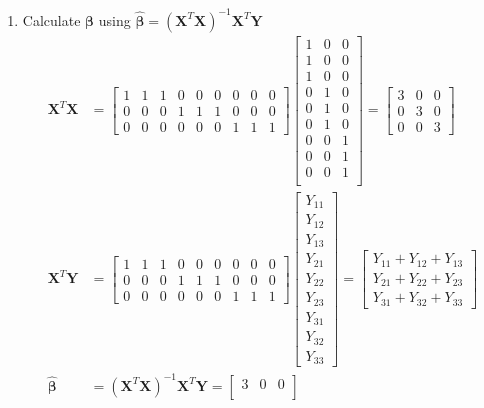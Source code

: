 \documentclass{article}
\begin{document}
\begin{enumerate}[leftmargin = 0 em, label = \arabic*., font = \bfseries]
\begin{enumerate}
		\item 
		Calculate $\bm \beta$ using $\hat{\bm \beta} = (\bm X^T \bm X)^{-1}\bm X^{T}\bm Y$
		\begin{align*}
		\bm X^T \bm X &= \begin{bmatrix}
			1&1&1&0&0&0&0&0&0\\
			0&0&0&1&1&1&0&0&0\\
			0&0&0&0&0&0&1&1&1
		\end{bmatrix} 
		\begin{bmatrix}
			1&0&0\\
			1&0&0\\
			1&0&0\\
			0&1&0\\
			0&1&0\\
			0&1&0\\
			0&0&1\\
			0&0&1\\
			0&0&1\\
		\end{bmatrix}
		= \begin{bmatrix}
			3&0&0\\
			0&3&0\\
			0&0&3
		\end{bmatrix}
		\\
		\bm X^T \bm Y & = \begin{bmatrix}
			1&1&1&0&0&0&0&0&0\\
			0&0&0&1&1&1&0&0&0\\
			0&0&0&0&0&0&1&1&1
		\end{bmatrix}
		\begin{bmatrix}
			Y_{11}\\
			Y_{12}\\
			Y_{13}\\
			Y_{21}\\
			Y_{22}\\
			Y_{23}\\
			Y_{31}\\
			Y_{32}\\
			Y_{33}
		\end{bmatrix}
		= \begin{bmatrix}
			Y_{11} + Y_{12} + Y_{13}\\
			Y_{21} + Y_{22} + Y_{23}\\
			Y_{31} + Y_{32} + Y_{33}
		\end{bmatrix}
		\\
		\hat{\bm \beta} &= (\bm X^T \bm X)^{-1}\bm X^T \bm Y = 
		{\begin{bmatrix}
			3&0&0\\

\end{bmatrix}}
\end{align*}
\end{enumerate}
\end{enumerate}
\end{document}
